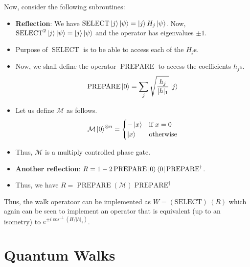 \documentclass[
10pt, %
a4paper, %
oneside, %
headinclude,footinclude, %
BCOR5mm, %
]{scrartcl}
\begin{document}
Now, consider the following subroutines:
\begin{itemize}
    \item \textbf{Reflection}: We have $\operatorname{SELECT} \ket{j} \ket{\psi} = \ket{j} H_j \ket{\psi}$.
    Now, $\operatorname{SELECT}^2\ket{j} \ket{\psi} = \ket{j} \ket{\psi}$ and the operator has eigenvalues $\pm 1$.
    \item Purpose of $\operatorname{SELECT}$ is to be able to access each of the $H_j$s.
    \item Now, we shall define the operator $\operatorname{PREPARE}$ to access the coefficients $h_j$s. 
    $$ \operatorname{PREPARE}\ket{0} = \sum_j \sqrt{\frac{h_j}{|h|_1}}\ket{j}$$
    \item Let us define $\mathcal{M}$ as follows.
    $$ \mathcal{M}\ket{0}^{\otimes n} = \begin{cases} -\ket{x} & \text{if } x = 0 \\ \ket{x} & \text{otherwise} \end{cases}$$
    \item Thus, $\mathcal{M}$ is a multiply controlled phase gate.
    \item \textbf{Another reflection}: $R = 1 - 2\operatorname{PREPARE} \ket{0}\bra{0} \operatorname{PREPARE}^{\dagger}$.
    \item Thus, we have $R = \operatorname{PREPARE} (\mathcal{M}) \operatorname{PREPARE}^{\dagger}$
\end{itemize}
Thus, the walk operatoor can be implemented as $W = \operatorname{(SELECT)}\ (R)$ which again can be seen to implement an operator that is equivalent (up to an isometry) to $e^{\pm i \cos^{-1}(H/|h|_1)}$.


\nocite{*}



\newpage
\appendix


\section{Quantum Walks}
\end{document}

